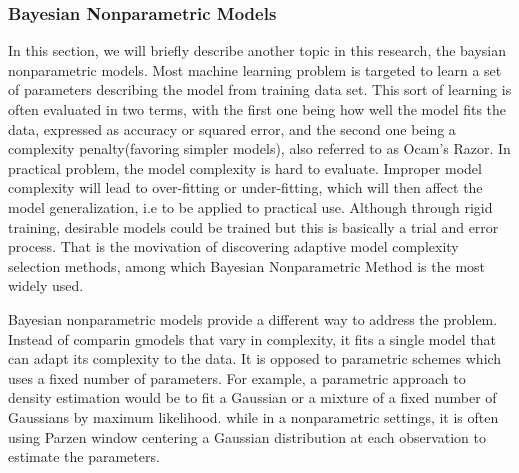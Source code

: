 \subsubsection{Bayesian Nonparametric Models}\label{bnp}
In this section, we will briefly describe another topic in this research, the baysian nonparametric models.
Most machine learning problem is targeted to learn a set of parameters describing the model from training data set. This sort of learning is often evaluated in two terms, with the first one being how well the model fits the data, expressed as accuracy or squared error, and the second one being a complexity penalty(favoring simpler models)\cite{gershman2012tutorial,escobar1995bayesian}, also referred to as Ocam's Razor. In practical problem, the model complexity is hard to evaluate. Improper model complexity will lead to over-fitting or under-fitting\cite{gershman2012tutorial,muller2004nonparametric}, which will then affect the model generalization, i.e to be applied to practical use. Although through rigid training, desirable models could be trained but this is basically a trial and error process\cite{hjort2010bayesian}. That is the movivation of discovering adaptive model complexity selection methods, among which Bayesian Nonparametric Method is the most widely used.

Bayesian nonparametric models provide a different way to address the problem. Instead of comparin gmodels that vary in complexity, it fits a single model that can adapt its complexity to the data. It is opposed to parametric schemes which uses a fixed number of parameters. For example, a parametric approach to density estimation would be to fit a Gaussian or a mixture of a fixed number of Gaussians by maximum likelihood\cite{walker1999bayesian,andrews2002support}. while in a nonparametric settings, it is often using Parzen window centering  a Gaussian distribution at each observation to estimate the parameters. 

